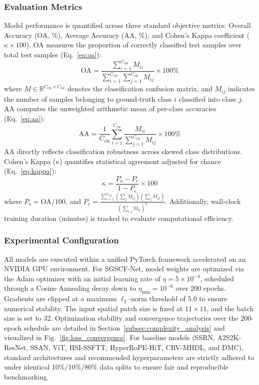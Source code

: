 \documentclass[manuscript,screen,review]{acmart}
\begin{document}
\subsubsection{Evaluation Metrics}
Model performance is quantified across three standard objective metrics: Overall Accuracy (OA, \%), Average Accuracy (AA, \%), and Cohen's Kappa coefficient ($\kappa \times 100$). OA measures the proportion of correctly classified test samples over total test samples (Eq.~\ref{eq:oa}):
\begin{equation}
\label{eq:oa}
\text{OA} = \frac{\sum_{i=1}^{C_{\text{cls}}} M_{ii}}{\sum_{i=1}^{C_{\text{cls}}} \sum_{j=1}^{C_{\text{cls}}} M_{ij}} \times 100\%
\end{equation}
where $M \in \mathbb{R}^{C_{\text{cls}} \times C_{\text{cls}}}$ denotes the classification confusion matrix, and $M_{ij}$ indicates the number of samples belonging to ground-truth class $i$ classified into class $j$. AA computes the unweighted arithmetic mean of per-class accuracies (Eq.~\ref{eq:aa}):
\begin{equation}
\label{eq:aa}
\text{AA} = \frac{1}{C_{\text{cls}}} \sum_{i=1}^{C_{\text{cls}}} \frac{M_{ii}}{\sum_{j=1}^{C_{\text{cls}}} M_{ij}} \times 100\%
\end{equation}
AA directly reflects classification robustness across skewed class distributions. Cohen's Kappa ($\kappa$) quantifies statistical agreement adjusted for chance (Eq.~\ref{eq:kappa}):
\begin{equation}
\label{eq:kappa}
\kappa = \frac{P_o - P_e}{1 - P_e} \times 100
\end{equation}
where $P_o = \text{OA} / 100$, and $P_e = \frac{\sum_{i=1}^{C_{\text{cls}}} (\sum_{j} M_{ij})(\sum_{j} M_{ji})}{(\sum_{i,j} M_{ij})^2}$. Additionally, wall-clock training duration (minutes) is tracked to evaluate computational efficiency.

\subsubsection{Experimental Configuration}
All models are executed within a unified PyTorch framework accelerated on an NVIDIA GPU environment. For SGSCF-Net, model weights are optimized via the Adam optimizer with an initial learning rate of $\eta = 5 \times 10^{-4}$, scheduled through a Cosine Annealing decay down to $\eta_{\min} = 10^{-6}$ over 200 epochs. Gradients are clipped at a maximum $\ell_2$-norm threshold of 5.0 to ensure numerical stability. The input spatial patch size is fixed at $11 \times 11$, and the batch size is set to 32. Optimization stability and convergence trajectories over the 200-epoch schedule are detailed in Section~\ref{subsec:complexity_analysis} and visualized in Fig.~\ref{fig:loss_convergence}. For baseline models (SSRN, A2S2K-ResNet, SSAN, ViT, HSI-SSFTT, HyperRoPE-HiT, CRV-MHDL, and DMC), standard architectures and recommended hyperparameters are strictly adhered to under identical 10\%/10\%/80\% data splits to ensure fair and reproducible benchmarking.
\end{document}
